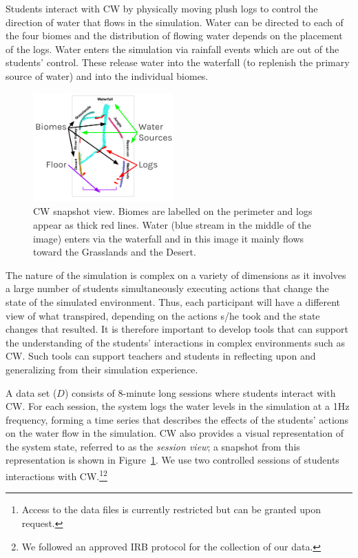 \documentclass[letterpaper]{article} %
\begin{document}
Students interact with CW by physically moving plush logs to control the direction of water that flows in the simulation. Water can be directed to each of the four biomes and the distribution of flowing water depends on the placement of the logs. Water enters the simulation via rainfall events which are out of the students' control. These release water into the waterfall (to replenish the primary source of water) and into the individual biomes.

\begin{figure}[t]
\centering
\includegraphics[width=0.48\textwidth]{./images/cw_snapshot.png}
\caption{CW snapshot view. Biomes are labelled on the perimeter and logs appear as thick red lines. Water (blue stream in the middle of the image) enters via the waterfall and in this image it mainly flows toward the Grasslands and the Desert.}
\label{fig:connected_worlds_graphic}
\end{figure}

The nature of the simulation is complex on a variety of dimensions as it involves a large number of students simultaneously executing actions that change the state of the simulated environment. Thus, each participant will have a different view of what transpired, depending on the actions s/he took and the state changes that resulted.
It is therefore important to develop tools that can support  the understanding of the students' interactions in complex environments such as CW.
Such tools can  support teachers and students in reflecting upon and generalizing from their simulation experience.

A data set ($D$) consists of 8-minute long sessions where students interact with CW.
For each session, the system logs the water levels in the simulation at a 1Hz frequency, forming a time series that describes the effects of the students' actions on the water flow in the simulation.
CW also provides
a visual representation of the system state, referred to as the \emph{session view}; a snapshot from this representation is shown in Figure~\ref{fig:connected_worlds_graphic}.
We use two controlled sessions of students interactions with CW.\footnote{Access to the data files is currently restricted but can be granted upon request.}\footnote{We followed an approved IRB protocol for the collection of our data.}
\end{document}
